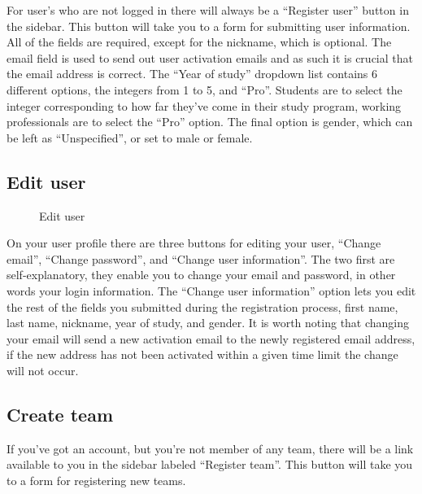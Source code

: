 For user{\textquoteright}s who are not logged in there will always be a
{\textquotedblleft}Register user{\textquotedblright} button in the
sidebar. This button will take you to a form for submitting user
information. All of the fields are required, except for the nickname,
which is optional. The email field is used to send out user activation
emails and as such it is crucial that the email address is correct. The
{\textquotedblleft}Year of study{\textquotedblright} dropdown list
contains 6 different options, the integers from 1 to 5, and
{\textquotedblleft}Pro{\textquotedblright}. Students are to select the
integer corresponding to how far they{\textquoteright}ve come in their
study program, working professionals are to select the
{\textquotedblleft}Pro{\textquotedblright} option. The final option is
gender, which can be left as
{\textquotedblleft}Unspecified{\textquotedblright}, or set to male or
female.


\subsection{Edit user}

\begin{figure}
\centering
	\caption{Edit user}
	\label{fig:editUser}
\end{figure}

On your user profile there are three buttons for editing your user,
{\textquotedblleft}Change email{\textquotedblright},
{\textquotedblleft}Change password{\textquotedblright}, and
{\textquotedblleft}Change user information{\textquotedblright}. The two
first are self-explanatory, they enable you to change your email and
password, in other words your login information. The
{\textquotedblleft}Change user information{\textquotedblright} option
lets you edit the rest of the fields you submitted during the
registration process, first name, last name, nickname, year of study,
and gender. It is worth noting that changing your email will send a new
activation email to the newly registered email address, if the new
address has not been activated within a given time limit the change
will not occur.

\subsection{Create team}

If you{\textquoteright}ve got an account, but you{\textquoteright}re not
member of any team, there will be a link available to you in the
sidebar labeled {\textquotedblleft}Register team{\textquotedblright}.
This button will take you to a form for registering new teams. 


